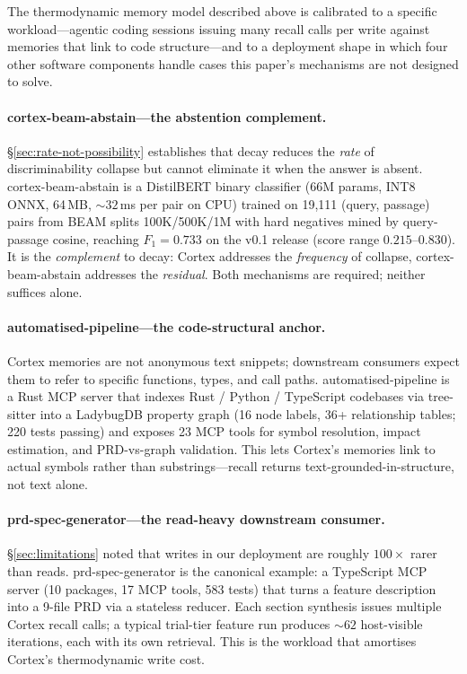 \documentclass[11pt]{article}
\begin{document}
The thermodynamic memory model described above is calibrated to a
specific workload---agentic coding sessions issuing many recall
calls per write against memories that link to code structure---and
to a deployment shape in which four other software components
handle cases this paper's mechanisms are not designed to solve.

\paragraph{cortex-beam-abstain---the abstention complement.}
\S\ref{sec:rate-not-possibility} establishes that decay reduces the
\emph{rate} of discriminability collapse but cannot eliminate it
when the answer is absent.  cortex-beam-abstain \citep{Deust2026a}
is a DistilBERT binary classifier (66M params, INT8 ONNX, 64\,MB,
${\sim}32$\,ms per pair on CPU) trained on 19{,}111 (query, passage)
pairs from BEAM splits 100K/500K/1M with hard negatives mined by
query-passage cosine, reaching $F_1 = 0.733$ on the v0.1 release
(score range $0.215$--$0.830$).  It is the \emph{complement} to
decay: Cortex addresses the \emph{frequency} of collapse,
cortex-beam-abstain addresses the \emph{residual}.  Both mechanisms
are required; neither suffices alone.

\paragraph{automatised-pipeline---the code-structural anchor.}
Cortex memories are not anonymous text snippets; downstream
consumers expect them to refer to specific functions, types, and
call paths.  automatised-pipeline \citep{Deust2026b} is a Rust MCP
server that indexes Rust / Python / TypeScript codebases via
tree-sitter into a LadybugDB property graph (16 node labels, 36+
relationship tables; 220 tests passing) and exposes 23 MCP tools
for symbol resolution, impact estimation, and PRD-vs-graph
validation.  This lets Cortex's memories link to actual symbols
rather than substrings---recall returns text-grounded-in-structure,
not text alone.

\paragraph{prd-spec-generator---the read-heavy downstream consumer.}
\S\ref{sec:limitations} noted that writes in our deployment are
roughly $100\times$ rarer than reads.  prd-spec-generator
\citep{Deust2026c} is the canonical example: a TypeScript MCP
server (10 packages, 17 MCP tools, 583 tests) that turns a feature
description into a 9-file PRD via a stateless reducer.  Each
section synthesis issues multiple Cortex recall calls; a typical
trial-tier feature run produces ${\sim}62$ host-visible iterations,
each with its own retrieval.  This is the workload that amortises
Cortex's thermodynamic write cost.
\end{document}

